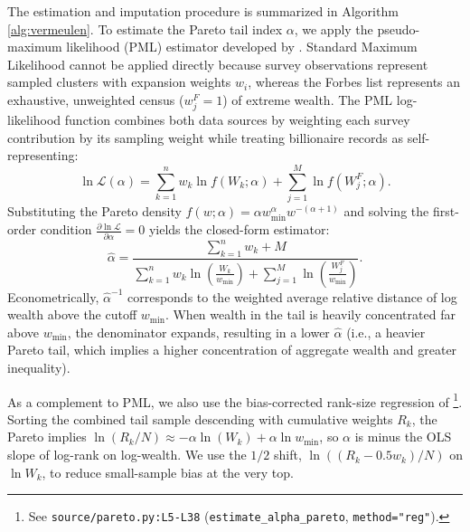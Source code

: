 The estimation and imputation procedure is summarized in Algorithm \ref{alg:vermeulen}. To estimate the Pareto tail index $\alpha$, we apply the pseudo-maximum likelihood (PML) estimator developed by \citet{vermeulen2018}. Standard Maximum Likelihood cannot be applied directly because survey observations represent sampled clusters with expansion weights $w_i$, whereas the Forbes list represents an exhaustive, unweighted census ($w_j^F = 1$) of extreme wealth. The PML log-likelihood function combines both data sources by weighting each survey contribution by its sampling weight while treating billionaire records as self-representing:
\begin{equation}
    \ln \mathcal{L}(\alpha) = \sum_{k=1}^n w_k \ln f(W_k; \alpha) + \sum_{j=1}^M \ln f(W_j^F; \alpha).
    \label{eq:pml_loglik}
\end{equation}
Substituting the Pareto density $f(w; \alpha) = \alpha w_{\min}^\alpha w^{-(\alpha + 1)}$ and solving the first-order condition $\frac{\partial \ln \mathcal{L}}{\partial \alpha} = 0$ yields the closed-form estimator:
\begin{equation}
    \hat{\alpha} = \frac{\sum_{k=1}^n w_k + M}{\sum_{k=1}^n w_k \ln\left(\frac{W_k}{w_{\min}}\right) + \sum_{j=1}^M \ln\left(\frac{W_j^F}{w_{\min}}\right)}.
    \label{eq:alpha_pml}
\end{equation}
Econometrically, $\hat{\alpha}^{-1}$ corresponds to the weighted average relative distance of log wealth above the cutoff $w_{\min}$. When wealth in the tail is heavily concentrated far above $w_{\min}$, the denominator expands, resulting in a lower $\hat{\alpha}$ (i.e., a heavier Pareto tail, which implies a higher concentration of aggregate wealth and greater inequality).

As a complement to PML, we also use the bias-corrected rank-size regression of \citet{gabaix2011rank}\footnote{See \texttt{source/pareto.py:L5-L38} (\texttt{estimate\_alpha\_pareto}, \texttt{method="reg"}).}. Sorting the combined tail sample descending with cumulative weights $R_k$, the Pareto implies $\ln(R_k/N)\approx -\alpha\ln(W_k)+\alpha\ln w_{\min}$, so $\alpha$ is minus the OLS slope of log-rank on log-wealth. We use the $1/2$ shift, $\ln((R_k-0.5w_k)/N)$ on $\ln W_k$, to reduce small-sample bias at the very top.

